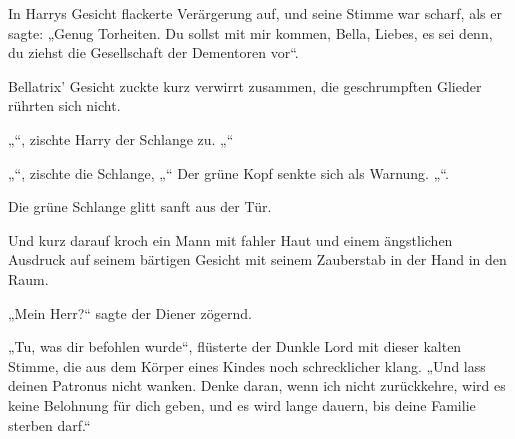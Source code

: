 In Harrys Gesicht flackerte Verärgerung auf, und seine Stimme war scharf, als er sagte:
„Genug Torheiten. Du sollst mit mir kommen, Bella, Liebes, es sei denn, du ziehst die Gesellschaft der Dementoren vor“.

Bellatrix’ Gesicht zuckte kurz verwirrt zusammen, die geschrumpften Glieder rührten sich nicht.

„“, zischte Harry der Schlange zu. „“

„“, zischte die Schlange, „“ Der grüne Kopf senkte sich als Warnung. „“.

Die grüne Schlange glitt sanft aus der Tür.

Und kurz darauf kroch ein Mann mit fahler Haut und einem ängstlichen Ausdruck auf seinem bärtigen Gesicht mit seinem Zauberstab in der Hand in den Raum.

„Mein Herr?“ sagte der Diener zögernd.

„Tu, was dir befohlen wurde“, flüsterte der Dunkle Lord mit dieser kalten Stimme, die aus dem Körper eines Kindes noch schrecklicher klang.
„Und lass deinen Patronus nicht wanken. Denke daran, wenn ich nicht zurückkehre, wird es keine Belohnung für dich geben, und es wird lange dauern, bis deine Familie sterben darf.“

